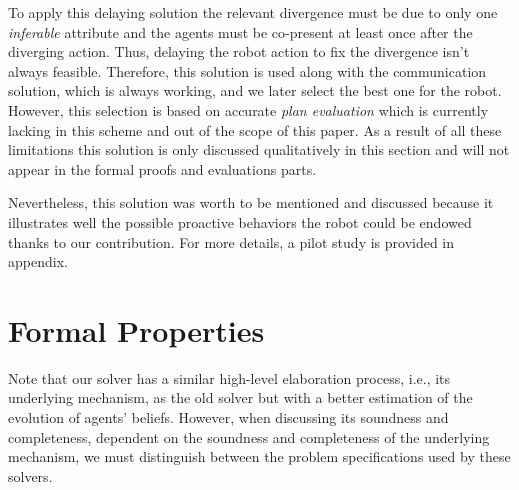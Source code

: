 \documentclass[letterpaper]{article} %
\begin{document}






To apply this delaying solution the relevant divergence must be due to only one \textit{inferable} attribute and the agents must be co-present at least once after the diverging action. Thus, delaying the robot action to fix the divergence isn't always feasible. Therefore, this solution is used along with the communication solution, which is always working, and we later select the best one for the robot. However, this selection is based on accurate \textit{plan evaluation} which is currently lacking in this scheme and out of the scope of this paper.
As a result of all these limitations this solution is only discussed qualitatively in this section and will not appear in the formal proofs and evaluations parts. 

Nevertheless, this solution was worth to be mentioned and discussed because it illustrates well the possible proactive behaviors the robot could be endowed thanks to our contribution. For more details, a pilot study is provided in appendix.




\section{Formal Properties}
Note that our solver has a similar high-level elaboration process, i.e., its underlying mechanism, as the old solver but with a better estimation of the evolution of agents' beliefs.  
However, when discussing its soundness and completeness, dependent on the soundness and completeness of the underlying mechanism, we must distinguish between the problem specifications used by these solvers. 
\end{document}
